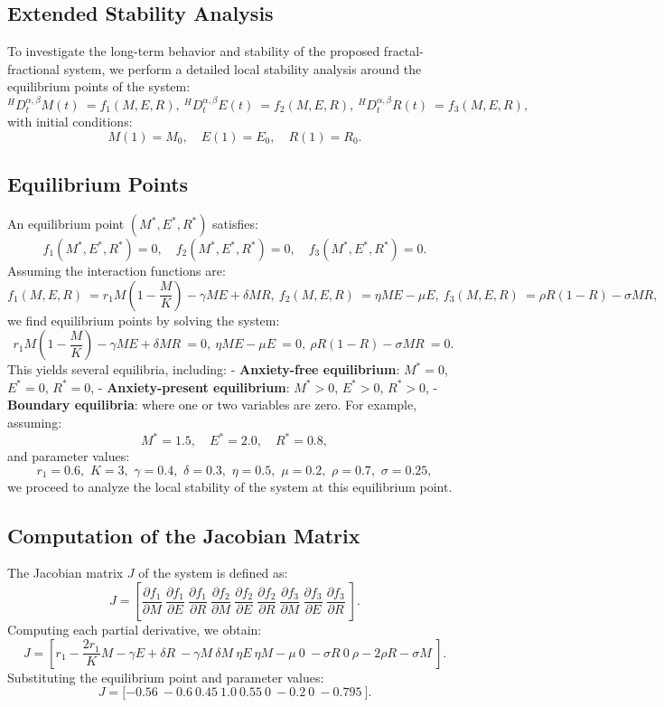 \documentclass[10pt]{NSP1}
\begin{document}
\subsection{Extended Stability Analysis}
To investigate the long-term behavior and stability of the proposed fractal-fractional system, we perform a detailed local stability analysis around the equilibrium points of the system:
\[^{H}D_{t}^{\alpha,\beta}M(t)\  = f_{1}(M,E,R),\ ^{H}D_{t}^{\alpha,\beta}E(t)\  = f_{2}(M,E,R),\ ^{H}D_{t}^{\alpha,\beta}R(t)\  = f_{3}(M,E,R),\ \]
with initial conditions:
\[M(1) = M_{0},\quad E(1) = E_{0},\quad R(1) = R_{0}.\]
\subsection*{Equilibrium Points}
An equilibrium point \(\left( M^{*},E^{*},R^{*} \right)\) satisfies:
\[f_{1}\left( M^{*},E^{*},R^{*} \right) = 0,\quad f_{2}\left( M^{*},E^{*},R^{*} \right) = 0,\quad f_{3}\left( M^{*},E^{*},R^{*} \right) = 0.\]
Assuming the interaction functions are:
\[f_{1}(M,E,R)\  = r_{1}M\left( 1 - \frac{M}{K} \right) - \gamma ME + \delta MR,\ f_{2}(M,E,R)\  = \eta ME - \mu E,\ f_{3}(M,E,R)\  = \rho R(1 - R) - \sigma MR,\ \]
we find equilibrium points by solving the system:
\[r_{1}M\left( 1 - \frac{M}{K} \right) - \gamma ME + \delta MR\  = 0,\ \eta ME - \mu E\  = 0,\ \rho R(1 - R) - \sigma MR\  = 0.\ \]
This yields several equilibria, including:
- \textbf{Anxiety-free equilibrium}: \(M^{*} = 0\), \(E^{*} = 0\), \(R^{*} = 0\),
- \textbf{Anxiety-present equilibrium}: \(M^{*} > 0\), \(E^{*} > 0\), \(R^{*} > 0\),
- \textbf{Boundary equilibria}: where one or two variables are zero.
For example, assuming:
\[M^{*} = 1.5,\quad E^{*} = 2.0,\quad R^{*} = 0.8,\]
and parameter values:
\[r_{1} = 0.6,\mspace{6mu} K = 3,\mspace{6mu}\gamma = 0.4,\mspace{6mu}\delta = 0.3,\mspace{6mu}\eta = 0.5,\mspace{6mu}\mu = 0.2,\mspace{6mu}\rho = 0.7,\mspace{6mu}\sigma = 0.25,\]
we proceed to analyze the local stability of the system at this equilibrium point.
\subsection{Computation of the Jacobian Matrix}
The Jacobian matrix \(J\) of the system is defined as:
\[J = \left\lbrack \frac{\partial f_{1}}{\partial M}\ \frac{\partial f_{1}}{\partial E}\ \frac{\partial f_{1}}{\partial R}\ \frac{\partial f_{2}}{\partial M}\ \frac{\partial f_{2}}{\partial E}\ \frac{\partial f_{2}}{\partial R}\ \frac{\partial f_{3}}{\partial M}\ \frac{\partial f_{3}}{\partial E}\ \frac{\partial f_{3}}{\partial R}\  \right\rbrack.\]
Computing each partial derivative, we obtain:
\[J = \left\lbrack r_{1} - \frac{2r_{1}}{K}M - \gamma E + \delta R\  - \gamma M\ \delta M\ \eta E\ \eta M - \mu\ 0\  - \sigma R\ 0\ \rho - 2\rho R - \sigma M\  \right\rbrack.\]
Substituting the equilibrium point and parameter values:
\[J = \lbrack - 0.56\  - 0.6\ 0.45\ 1.0\ 0.55\ 0\  - 0.2\ 0\  - 0.795\ \rbrack.\]
\end{document}
